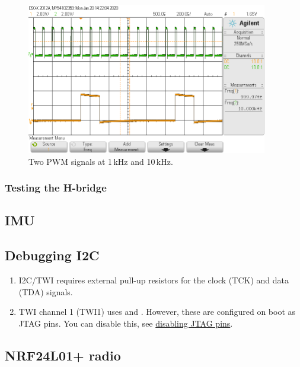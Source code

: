 \begin{figure}
\centering
\includegraphics[height=2.60417in]{figs/PWM_2.png}
\caption{Two PWM signals at 1\,kHz and 10\,kHz.}
\end{figure}


\subsubsection{Testing the H-bridge}
\label{testing-the-h-bridge}



\subsection{IMU}
\label{imu}

\subsection{Debugging I2C}
\label{debugging-i2c}

\begin{enumerate}
\item
  I2C/TWI requires external pull-up resistors for the clock (TCK) and
  data (TDA) signals.
\item
  TWI channel 1 (TWI1) uses  and . However, these are configured
  on boot as JTAG pins. You can disable this, see
  \hyperref[disabling-jtag-pins]{disabling JTAG pins}.
\end{enumerate}



\subsection{NRF24L01+ radio}
\label{nrf24l01-radio}

